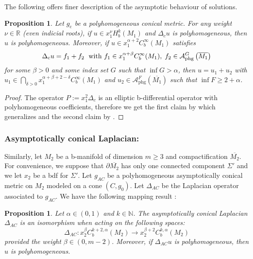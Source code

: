 \documentclass[a4paper,11pt]{article}
\newcounter{mythm}[section]
\newtheorem{pr}[mythm]{Proposition}
\def\R{\mathbb{R}}
\def\N{\mathbb{N}}
\begin{document}
The following offers finer description of the asymptotic behaviour of solutions.
\begin{pr} \label{phgconlap}
Let $g_{\mathrm{c}}$ be a polyhomogeneous conical metric. For any weight $\nu \in \R$ (even indicial roots), if $u \in x_1^{\nu}   H_b^{k}(M_1)$ and $\Delta_c u$ is polyhomogeneous, then $u$ is polyhomogeneous. Moreover, if $u \in x_1^{\alpha+2}   C_b^{\infty}(M_1)$ satisfies
$$
\Delta_{\mathrm{c}} u=f_1+f_2 \hspace{0.1cm} \text { with } f_1 \in x_1^{\alpha+\beta} C_b^{\infty}(M_1), \hspace{0.1cm} f_2 \in \mathcal{A}_{\mathrm{phg}}^{G}\left(\overline{M_1}\right)
$$
for some $\beta>0$ and some index set $G$ such that $\inf G > \alpha$, then $u=u_1+u_2$ with $u_1 \in \bigcap_{\delta>0} x_1^{\alpha+\beta+2-\delta} C_b^{\infty}(M_1)$ and $u_2 \in \mathcal{A}_{\mathrm{phg}}^{F}(\overline{M_1})$ such that $\inf F  \geq 2+ \alpha$.
\end{pr}
\begin{proof}
    The operator $P := x_1^2 \Delta_c$ is an elliptic b-differential operator with polyhomogeneous coefficients, therefore we get the first claim by \cite[Corollary 3.7]{conlon_moduli_2015} which generalizes \cite[Proposition 5.61]{melrose_atiyah-patodi-singer_1993} and the second claim by \cite[Corollary 3.8]{conlon_moduli_2015}. 
\end{proof}
\subsubsection*{Asymptotically conical Laplacian:}
Similarly, let $M_2$ be a b-manifold of dimension $m \geq 3$ and compactification $\overline{M_2}$. For convenience, we suppose that $ \partial \overline{M_2}$ has only one connected component $\Sigma'$ and we let $x_2$ be a bdf for $\Sigma'$. Let $g_{AC}$ be a polyhomogeneous asymptotically conical metric on $M_2$ modeled on a cone $(C, g_0)$. Let $\Delta_{AC}$ be the Laplacian operator associated to $g_{AC}$. We have the following mapping result \cite{lockhart_elliptic_1985, marshall_deformations_nodate, conlon_moduli_2015, melrose_atiyah-patodi-singer_1993}:
\begin{pr} \label{aclap}
Let $\alpha \in (0,1)$ and $k \in \N$. The asymptotically conical Laplacian $\Delta_{AC}$ is an isomorphism when acting on the following spaces:
    $$\Delta_{AC}: x_2^{ \beta } C_{b}^{k+2, \alpha}(M_2) \rightarrow x_2^{\beta + 2 } C_{b}^{k, \alpha}(M_2)$$
    provided the weight $\beta \in (0,m-2)$. Moreover, if $\Delta_{AC} u$ is polyhomogeneous, then $u$ is polyhomogeneous. 
\end{pr}
\end{document}
